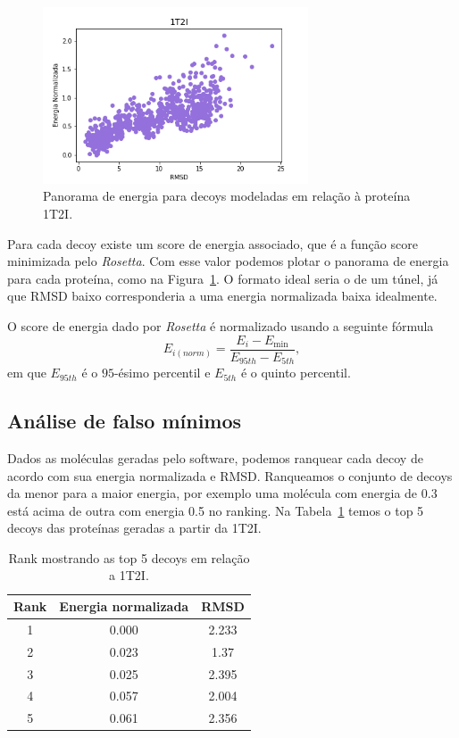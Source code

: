 \begin{figure}[!htbp]
    \centering
    \includegraphics[width=0.7\textwidth]{beamer/images/1t2i_tunnel.png}
    \caption{Panorama de energia para decoys modeladas em relação à proteína 1T2I.}
    \label{fig:1t2iland}
    \fautor
\end{figure}

Para cada decoy existe um score de energia associado, que é a função score minimizada pelo \textit{Rosetta}.
Com esse valor podemos plotar o panorama de energia para cada proteína, como na Figura~\ref{fig:1t2iland}.
O formato ideal seria o de um túnel, já que RMSD baixo corresponderia a uma energia normalizada baixa idealmente.

O score de energia dado por \textit{Rosetta} é normalizado usando a seguinte fórmula
\begin{equation}
    E_{i(norm)} = \frac{E_i - E_{\min}}{E_{95th} - E_{5th}},
\end{equation}
em que $E_{95th}$ é o $95$-ésimo percentil e $E_{5th}$ é o quinto percentil.

\subsection{Análise de falso mínimos}
Dados as moléculas geradas pelo software, podemos ranquear cada decoy de acordo com sua energia normalizada
e RMSD. Ranqueamos o conjunto de decoys da menor para a maior energia, por exemplo uma molécula com energia
de 0.3 está acima de outra com energia 0.5 no ranking. Na Tabela~\ref{tab:protrank} temos o top 5 decoys
das proteínas geradas a partir da 1T2I.

\begin{table}[!htbp]
    \centering
    \caption{Rank mostrando as top 5 decoys em relação a 1T2I.}
    \label{tab:protrank}
    \begin{tabular}{@{}ccc@{}}
        \toprule
        Rank & Energia normalizada & RMSD  \\
        \midrule
        1    & 0.000             & 2.233 \\
        2    & 0.023             & 1.37  \\
        3    & 0.025             & 2.395 \\
        4    & 0.057             & 2.004 \\
        5    & 0.061             & 2.356 \\
        \bottomrule
    \end{tabular}
\end{table}

